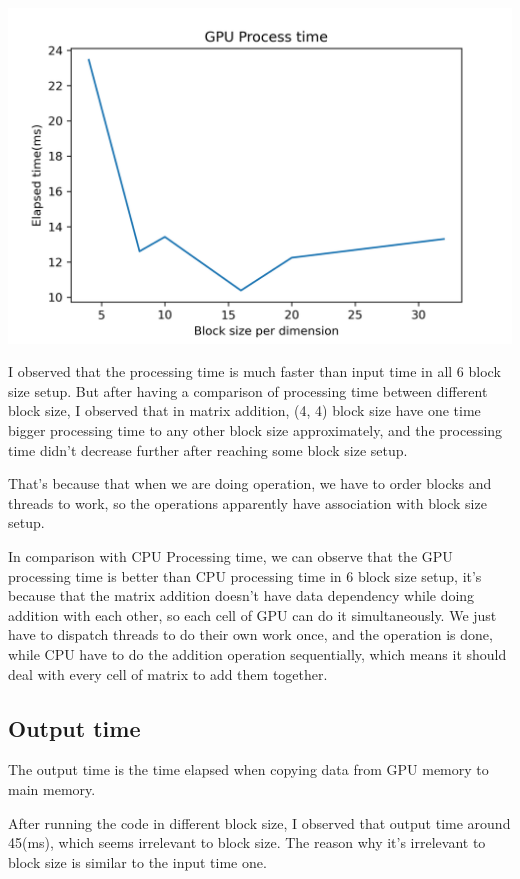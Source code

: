\documentclass{article}
\begin{document}
	\includegraphics[width=\linewidth]{notebook/gpu_process_time}
	
	I observed that the processing time is much faster than input time in all 6 block size setup.
	But after having a comparison of processing time between different block size, I observed that in matrix addition, (4, 4) block size have one time bigger processing time to any other block size approximately, and the processing time didn't decrease further after reaching some block size setup.
	
	That's because that when we are doing operation, we have to order blocks and threads to work, so the operations apparently have association with block size setup.
	
	In comparison with CPU Processing time, we can observe that the GPU processing time is better than CPU processing time in 6 block size setup, it’s because that the matrix addition doesn’t have data dependency while doing addition with each other, so each cell of GPU can do it simultaneously. We just have to dispatch threads to do their own work once, and the operation is done, while CPU have to do the addition operation sequentially, which means it should deal with every cell of matrix to add them together. 
	
	\subsection{Output time}
	The output time is the time elapsed when copying data from GPU memory to main memory.
	
	After running the code in different block size, I observed that output time around 45(ms), which seems irrelevant to block size. The reason why it's irrelevant to block size is similar to the input time one.
	
\end{document}
